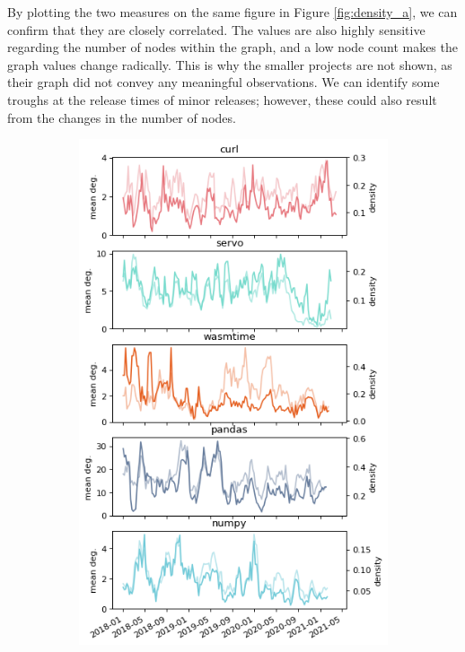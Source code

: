 By plotting the two measures on the same figure in Figure \ref{fig:density_a}, we can confirm that they are closely correlated. The values are also highly sensitive regarding the number of nodes within the graph, and a low node count makes the graph values change radically. This is why the smaller projects are not shown, as their graph did not convey any meaningful observations. We can identify some troughs at the release times of minor releases; however, these could also result from the changes in the number of nodes.

\begin{figure}[!htbp]
    \centering
    \begin{subfigure}{0.53\textwidth}
        \centering
        \includegraphics[width=\textwidth]{figures/qualitative/mean_deg_density/mean_deg.png}

\end{subfigure}
\end{figure}
